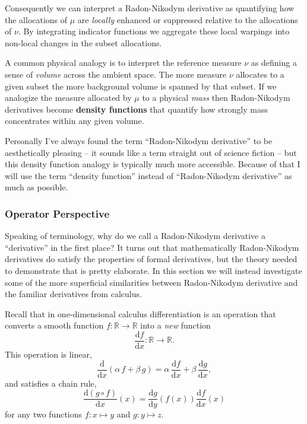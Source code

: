\documentclass[
  letterpaper,
  DIV=11,
  numbers=noendperiod]{scrartcl}
\begin{document}
Consequently we can interpret a Radon-Nikodym derivative as quantifying
how the allocations of \(\mu\) are \emph{locally} enhanced or suppressed
relative to the allocations of \(\nu\). By integrating indicator
functions we aggregate these local warpings into non-local changes in
the subset allocations.

A common physical analogy is to interpret the reference measure \(\nu\)
as defining a sense of \emph{volume} across the ambient space. The more
measure \(\nu\) allocates to a given subset the more background volume
is spanned by that subset. If we analogize the measure allocated by
\(\mu\) to a physical \emph{mass} then Radon-Nikodym derivatives become
\textbf{density functions} that quantify how strongly mass concentrates
within any given volume.

Personally I've always found the term ``Radon-Nikodym derivative'' to be
aesthetically pleasing -- it sounds like a term straight out of science
fiction -- but this density function analogy is typically much more
accessible. Because of that I will use the term ``density function''
instead of ``Radon-Nikodym derivative'' as much as possible.

\hypertarget{operator-perspective}{%
\subsubsection{Operator Perspective}\label{operator-perspective}}

Speaking of terminology, why do we call a Radon-Nikodym derivative a
``derivative'' in the first place? It turns out that mathematically
Radon-Nikodym derivatives do satisfy the properties of formal
derivatives, but the theory needed to demonstrate that is pretty
elaborate. In this section we will instead investigate some of the more
superficial similarities between Radon-Nikodym derivative and the
familiar derivatives from calculus.

Recall that in one-dimensional calculus differentiation is an operation
that converts a smooth function \(f: \mathbb{R} \rightarrow \mathbb{R}\)
into a \emph{new} function \[
\frac{ \mathrm{d} f }{ \mathrm{d} x} :
\mathbb{R} \rightarrow \mathbb{R}.
\] This operation is linear, \[
\frac{ \mathrm{d} }{ \mathrm{d} x}
\left( \alpha \, f + \beta \, g \right)
=
  \alpha \, \frac{ \mathrm{d} f }{ \mathrm{d} x}
+ \beta \, \frac{ \mathrm{d} g }{ \mathrm{d} x},
\] and satisfies a chain rule, \[
\frac{ \mathrm{d} (g \circ f)}{ \mathrm{d} x}(x)
=
\frac{ \mathrm{d} g}{ \mathrm{d} y}(f(x))
\frac{ \mathrm{d} f}{ \mathrm{d} x}(x)
\] for any two functions \(f: x \mapsto y\) and \(g: y \mapsto z\).
\end{document}
